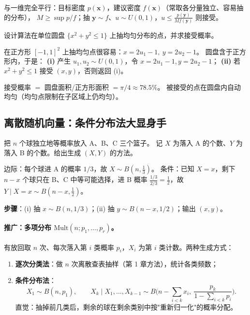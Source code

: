 与一维完全平行：目标密度 $p(\bm x)$，建议密度 $f(\bm x)$（常取各分量独立、容易抽的分布），
$M\ge\sup p/f$；抽 $\bm y\sim f$、$u\sim U(0,1)$，$u\le\frac{p(\bm y)}{Mf(\bm y)}$ 则接受。

\begin{exbox}[单位圆盘上的均匀点]
设计算法在单位圆盘 $\{x^2+y^2\le1\}$ 上抽均匀分布的点，并求接受概率。
\end{exbox}
\begin{sol}
在正方形 $[-1,1]^2$ 上抽均匀点很容易：$x=2u_1-1,\ y=2u_2-1$。
圆盘含于正方形内，于是：
\textbf{(i)} 产生 $u_1,u_2\sim U(0,1)$，令 $x=2u_1-1,y=2u_2-1$；
\textbf{(ii)} 若 $x^2+y^2\le1$ 接受 $(x,y)$，否则返回 (i)。

接受概率 $=$ 圆盘面积/正方形面积 $=\pi/4\approx78.5\%$。
被接受的点在圆盘内自动均匀（均匀点限制在子区域上仍均匀）。
\end{sol}

\subsection{离散随机向量：条件分布法大显身手}

\begin{exbox}
把 $n$ 个球独立地等概率放入 A、B、C 三个篮子。
记 $X$ 为落入 A 的个数、$Y$ 为落入 B 的个数。给出生成 $(X,Y)$ 的方法。
\end{exbox}
\begin{sol}
边际：每个球进 A 的概率 $1/3$，故 $X\sim B(n,\frac13)$。
条件：已知 $X=x$，剩下 $n-x$ 个球只在 B、C 中等可能选择，进 B 概率
$\frac{1/3}{2/3}=\frac12$，故 $Y\mid X=x\sim B(n-x,\frac12)$。

\textbf{步骤}：(i) 抽 $x\sim B(n,1/3)$；(ii) 抽 $y\sim B(n-x,1/2)$；输出 $(x,y)$。
\end{sol}

\paragraph{推广：多项分布 $\mathrm{Mult}(n;p_1,\dots,p_r)$。}
有放回取 $n$ 次、每次落入第 $i$ 类概率 $p_i$，$X_i$ 为第 $i$ 类计数。两种生成方式：
\begin{enumerate}[leftmargin=2em]
  \item \textbf{逐次分类法}：做 $n$ 次离散查表抽样（第 1 章方法），统计各类频数；
  \item \textbf{条件分布法}：
  \[
  X_1\sim B(n,p_1),\qquad
  X_k\mid X_1,\dots,X_{k-1}\sim B\Big(n-\sum_{i<k}x_i,\ \frac{p_k}{1-\sum_{i<k}p_i}\Big).
  \]
  直觉：抽掉前几类后，剩余的球在剩余类别中按"重新归一化"的概率分配。
\end{enumerate}

